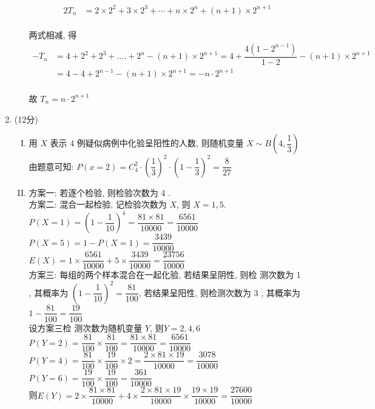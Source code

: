 \documentclass[11pt]{article}
\begin{document}
\begin{enumerate}
\begin{enumerate}[(I)]
\begin{align*}
		2 T_{n}&=2 \times 2^{2}+3 \times 2^{3}+\cdots+n \times 2^{n}+(n+1) \times 2^{n+1}
		\end{align*}
		\\两式相减, 得 
		\begin{align*}
			-T_{n}&=4+2^{2}+2^{3}+\ldots .+2^{n}-(n+1) \times 2^{n+1}
			=4+\dfrac{4\left(1-2^{n-1}\right)}{1-2}-(n+1) \times 2^{n+1}\\
			&=4-4+2^{n-1}-(n+1) \times 2^{n+1}=-n \cdot 2^{n+1}
		\end{align*}
		\\故 $T_{n}=n \cdot 2^{n+1}$
	\end{enumerate}
	\item (12分)
	\begin{enumerate}[(I)]
		\item 用 $X$ 表示 4 例疑似病例中化验呈阳性的人数, 则随机变量 $X \sim B\left(4, \dfrac{1}{3}\right)$ 
		\\由题意可知: $P(x=2)=C_{4}^{2} \cdot\left(\dfrac{1}{3}\right)^{2} \cdot\left(1-\dfrac{1}{3}\right)^{2}=\dfrac{8}{27}$ 
		\item 方案一: 若逐个检验, 则检验次数为 4 .
		\\方案二: 混合一起检验, 记检验次数为 $X$, 则 $X=1,5$.
		\\$P(X=1)=\left(1-\dfrac{1}{10}\right)^{4}=\dfrac{81 \times 81}{10000}=\dfrac{6561}{10000}$  \\$P(X=5)=1-P(X=1)=\dfrac{3439}{10000}$ 
		\\$E(X)=1 \times \dfrac{6561}{10000}+5 \times \dfrac{3439}{10000}=\dfrac{23756}{10000}$ 
		\\方案三: 每组的两个样本混合在一起化验, 若结果呈阴性, 则检 测次数为 1 , 其概率为 $\left(1-\dfrac{1}{10}\right)^{2}=\dfrac{81}{100}$, 
		若结果呈阳性, 则检测次数为 3 , 其概率为 $1-\dfrac{81}{100}=\dfrac{19}{100}$ 
		\\设方案三检 测次数为随机变量 $Y$, 则$Y=2,4,6$ \\$P(Y=2)=\dfrac{81}{100} \times \dfrac{81}{100}=\dfrac{81 \times 81}{10000}=\dfrac{6561}{10000} $
		\\$P(Y=4)=\dfrac{81}{100} \times \dfrac{19}{100} \times 2=\dfrac{2 \times 81 \times 19}{10000}=\dfrac{3078}{10000}
		$
		\\ $P(Y=6)=\dfrac{19}{100} \times \dfrac{19}{100}=\dfrac{361}{10000}$ 
		\\则$E(Y)=2 \times \dfrac{81 \times 81}{10000}+4 \times \dfrac{2 \times 81 \times 19}{10000} \times \dfrac{19 \times 19}{10000}=\dfrac{27600}{10000} $  

\end{enumerate}
\end{enumerate}
\end{document}
